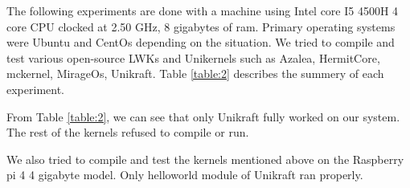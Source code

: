 \documentclass[11pt]{article}       %
\begin{document}
The following experiments are done with a machine using Intel core I5 4500H 4 core CPU  clocked at 2.50 GHz, 8 gigabytes of ram. Primary operating systems were Ubuntu and CentOs depending on the situation. We tried to compile and test various open-source LWKs and Unikernels such as Azalea, HermitCore, mckernel, MirageOs, Unikraft. 
Table \ref{table:2}  describes the summery of each experiment.



\begin{table}[htbp]
\caption{Experiment with various kernels}
\label{table:2}
\end{table}


From Table \ref{table:2}, we can see that only Unikraft fully worked on our system. The rest of the kernels refused to compile or run. 

We also tried to compile and test the kernels mentioned above on the Raspberry pi 4 4 gigabyte model. Only helloworld module of Unikraft ran properly.  
\end{document}
